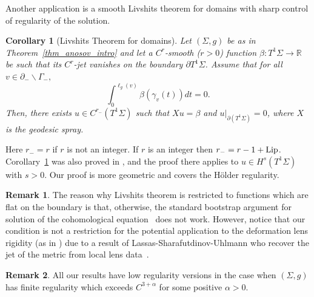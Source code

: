 \documentclass[10pt]{amsart}
\newcommand{\elg}{\ell_g}
\newtheorem{corintro}[thmintro]{Corollary}
\theoremstyle{definition}
\newtheorem*{remark*}{Remark}
\newcommand{\field}[1]{\mathbb{#1}}
\newcommand{\R}{\field{R}}
\renewcommand{\>}{{\rangle}}
\newcommand{\<}{{\langle}}
\begin{document}
Another application is a smooth Livshits theorem for domains with sharp control of regularity of the solution.

\begin{corintro}[Livshits Theorem for domains]
\label{thm_Livshits}
Let $(\Sigma, g)$ be as in Theorem~\ref{thm_anosov_intro} and let a $C^r$-smooth ($r>0$) function $\beta\colon T^1\Sigma\to\R$ be such that its $C^r$-jet vanishes on the boundary $\partial T^1\Sigma$. Assume that for all $v\in\partial_-\backslash \Gamma_-,$
\[
\int_{0}^{\elg(v)}\beta(\gamma_v(t))dt=0.
\]
Then, there exists $u\in C^{r_-}(T^1\Sigma)$ such that $Xu=\beta$ and $u|_{\partial(T^1\Sigma)}=0$, where $X$ is the geodesic spray.
\end{corintro}

Here $r_-=r$ if $r$ is not an integer. If $r$ is an integer then $r_-=r-1+\textup{Lip}$. Corollary~\ref{thm_Livshits} was also proved in \cite[Prop.\,5.5]{G17}, and the proof there applies to $u\in H^s(T^1\Sigma)$ with $s>0$. Our proof is more geometric and covers the Hölder regularity.

\begin{remark*}
The reason why Livshits theorem is restricted to functions which are flat on the boundary is that, otherwise, the standard bootstrap argument for solution of the cohomological equation~\cite{LMM86} does not work. However, notice that our condition is not a restriction for the potential application to the deformation lens rigidity (as in \cite{G17}) due to a result of Lassas-Sharafutdinov-Uhlmann who recover the jet of the metric from local lens data~\cite{LSU03}.
\end{remark*}

\begin{remark*} All our results have low regularity versions in the case when $(\Sigma, g)$ has finite regularity which exceeds $C^{3+\alpha}$ for some positive $\alpha>0$.
\end{remark*}
\end{document}
